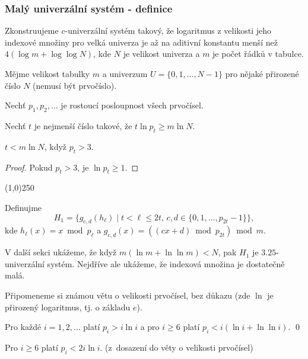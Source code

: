 \documentclass[a4paper,12pt]{article}
\newenvironment{myproof}{
  \begin{proof}
    
  }{
  \end{proof}
  \begin{center}
   \line(1,0){250}
   \end{center}
  }
\begin{document}
\subsubsection{Malý univerzální systém - definice}
Zkonstruujeme $c$-univerzální systém takový, 
že logaritmus z velikosti jeho indexové množiny pro velká 
univerza je až na aditivní konstantu menší než 
$4(\log m+\log\log N)$, kde $N$ je velikost univerza a $m$ je počet 
řádků v tabulce.  

Měj\-me velikost tabulky $m$ a univerzum $U=
\{0,1,\dots,N-1\}$ pro 
nějaké přirozené číslo $N$ (nemusí být prvočíslo).

\begin{definice}
    Nechť $p_1,p_2,\dots$ je rostoucí posloupnost všech 
    prvočísel.
\end{definice}

\begin{definice} Nechť $
t$ je 
nejmenší číslo takové, že $t\ln p_t\ge m\ln N$.
\end{definice}

\begin{lemma} $t < m\ln N$, když $p_t>3$.
\end{lemma}
\begin{myproof}
    Pokud $p_t>3$, je $\ln p_t \ge 1$.
\end{myproof}

\begin{definice} Definujme 
$$H_1=\{g_{c,d}(h_{\ell})\mid t<\ell\le 2t,\,c,d\in \{0,1,\dots,p_{
2t}-1\}\},$$
kde $h_{\ell}(x)=x\bmod p_{\ell}$ a 
$g_{c,d}(x)=((cx+d)\bmod p_{2t})\bmod m$.
\end{definice}

V další sekci ukážeme, že když $m(\ln m+\ln\ln m)<N$, pak $H_1$ je $
3.25$-univerzální systém. Nejdříve ale ukážeme, že indexová množina je dostatečně malá. 

Připomeneme si známou větu o velikosti prvočísel, bez důkazu 
(zde $\ln$ je přirozený logaritmus, tj. o základu $e$).

\begin{veta}Pro každé $i=1,2,\dots$ platí $p_i>i\ln 
i$ a pro $i\ge 6$ 
platí $p_i<i(\ln i+\ln\ln i)$. \qed
\end{veta}

\begin{pozorovani}
Pro $i\ge 6$ platí $p_i<2i\ln i$. (z~do\-sa\-ze\-ní do věty o velikosti prvočísel)
\end{pozorovani}
\end{document}
